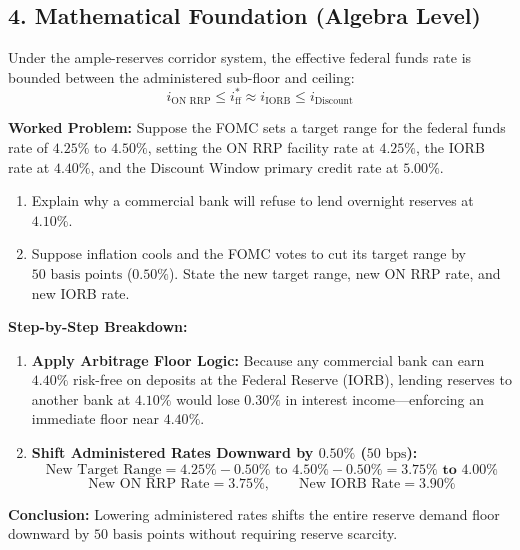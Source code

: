 \documentclass[11pt,letterpaper]{article}
\begin{document}
\subsection*{4. Mathematical Foundation (Algebra Level)}
Under the ample-reserves corridor system, the effective federal funds rate is bounded between the administered sub-floor and ceiling:
\begin{equation}
i_{\text{ON RRP}} \le i_{\text{ff}}^* \approx i_{\text{IORB}} \le i_{\text{Discount}}
\end{equation}

\noindent\textbf{Worked Problem:}
Suppose the FOMC sets a target range for the federal funds rate of $4.25\%$ to $4.50\%$, setting the ON RRP facility rate at $4.25\%$, the IORB rate at $4.40\%$, and the Discount Window primary credit rate at $5.00\%$.
\begin{enumerate}
    \item Explain why a commercial bank will refuse to lend overnight reserves at $4.10\%$.
    \item Suppose inflation cools and the FOMC votes to cut its target range by $50\text{ basis points}$ ($0.50\%$). State the new target range, new ON RRP rate, and new IORB rate.
\end{enumerate}

\noindent\textbf{Step-by-Step Breakdown:}
\begin{enumerate}
    \item \textbf{Apply Arbitrage Floor Logic:}
    Because any commercial bank can earn $4.40\%$ risk-free on deposits at the Federal Reserve (IORB), lending reserves to another bank at $4.10\%$ would lose $0.30\%$ in interest income—enforcing an immediate floor near $4.40\%$.

    \item \textbf{Shift Administered Rates Downward by $0.50\%$ ($50\text{ bps}$):}
    \[
    \text{New Target Range} = 4.25\% - 0.50\% \text{ to } 4.50\% - 0.50\% = \mathbf{3.75\% \text{ to } 4.00\%}
    \]
    \[
    \text{New ON RRP Rate} = \mathbf{3.75\%}, \qquad \text{New IORB Rate} = \mathbf{3.90\%}
    \]
\end{enumerate}
\textbf{Conclusion:} Lowering administered rates shifts the entire reserve demand floor downward by $50\text{ basis points}$ without requiring reserve scarcity.

\end{document}
